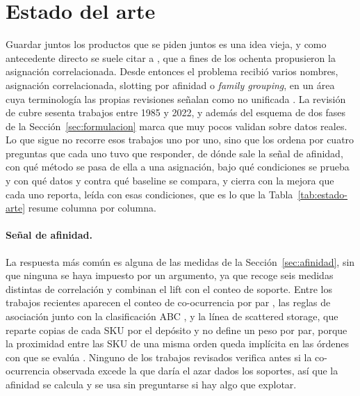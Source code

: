 
\section{Estado del arte}
\label{sec:estado}

Guardar juntos los productos que se piden juntos es una idea vieja, y como antecedente directo se suele citar a \citet{frazelle1989correlated}, que a fines de los ochenta propusieron la asignación correlacionada.
Desde entonces el problema recibió varios nombres, asignación correlacionada, slotting por afinidad o \emph{family grouping}, en un área cuya terminología las propias revisiones señalan como no unificada \citep{rojasreyes2019slap, islam2023cslap}.
La revisión de \citet{islam2023cslap} cubre sesenta trabajos entre 1985 y 2022, y además del esquema de dos fases de la Sección~\ref{sec:formulacion} marca que muy pocos validan sobre datos reales.
Lo que sigue no recorre esos trabajos uno por uno, sino que los ordena por cuatro preguntas que cada uno tuvo que responder, de dónde sale la señal de afinidad, con qué método se pasa de ella a una asignación, bajo qué condiciones se prueba y con qué datos y contra qué baseline se compara, y cierra con la mejora que cada uno reporta, leída con esas condiciones, que es lo que la Tabla~\ref{tab:estado-arte} resume columna por columna.

\paragraph{Señal de afinidad.}
La respuesta más común es alguna de las medidas de la Sección~\ref{sec:afinidad}, sin que ninguna se haya impuesto por un argumento, ya que \citet{zhang2016correlated} recoge seis medidas distintas de correlación y \citet{li2015dynamic} combinan el lift con el conteo de soporte.
Entre los trabajos recientes aparecen el conteo de co-ocurrencia por par \citep{islam2024heuristic, debold2025storage}, las reglas de asociación junto con la clasificación ABC \citep{benaglia2024cold}, y la línea de scattered storage, que reparte copias de cada SKU por el depósito y no define un peso por par, porque la proximidad entre las SKU de una misma orden queda implícita en las órdenes con que se evalúa \citep{gamezalban2024scattered, chen2026integrated}.
Ninguno de los trabajos revisados verifica antes si la co-ocurrencia observada excede la que daría el azar dados los soportes, así que la afinidad se calcula y se usa sin preguntarse si hay algo que explotar.

